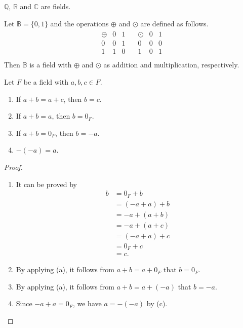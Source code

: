 \begin{example}
  $\mathbb{Q}$, $\mathbb{R}$ and $\mathbb{C}$ are fields.
\end{example}

\begin{example}
  Let $\mathbb{B} = \{0, 1\}$ and the operations $\oplus$ and $\odot$ are
  defined as follows.
  \begin{align*}
    \begin{array}{c|cc}
      \oplus & 0 & 1 \\
      \hline
      0      & 0 & 1 \\
      1      & 1 & 0 \\
    \end{array}
    \quad
    \begin{array}{c|cc}
      \odot & 0 & 1 \\
      \hline
      0     & 0 & 0 \\
      1     & 0 & 1 \\
    \end{array}
  \end{align*}
  Then $\mathbb{B}$ is a field with $\oplus$ and $\odot$ as addition and
  multiplication, respectively.
\end{example}

\begin{proposition}\label{prop:field-addition}
  Let $F$ be a field with $a, b, c \in F$.
  \begin{enumerate}
    \item If $a + b = a + c$, then $b = c$.
    \item If $a + b = a$, then $b = 0_F$.
    \item If $a + b = 0_F$, then $b = -a$.
    \item $-(-a) = a$.
  \end{enumerate}
\end{proposition}
\begin{proof} \leavevmode
  \begin{enumerate}
    \item It can be proved by
      \begin{align*}
        b
        &= 0_F + b      \\
        &= (-a + a) + b \\
        &= -a + (a + b) \\
        &= -a + (a + c) \\
        &= (-a + a) + c \\
        &= 0_F + c      \\
        &= c.
      \end{align*}
    \item By applying (a), it follows from $a + b = a + 0_F$ that $b = 0_F$.
    \item By applying (a), it follows from $a + b = a + (-a)$ that $b = -a$.
    \item Since $-a + a = 0_F$, we have $a = -(-a)$ by (c). \qedhere
  \end{enumerate}
\end{proof}

